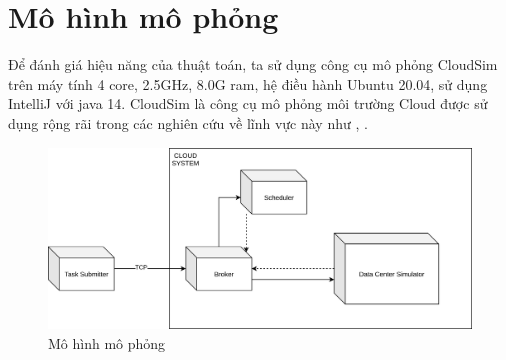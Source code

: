 \documentclass{my_style}
\begin{document}
\section{Mô hình mô phỏng}
Để đánh giá hiệu năng của thuật toán, ta sử dụng công cụ mô phỏng CloudSim~\cite{30} trên máy tính 4 core, 2.5GHz, 8.0G ram, hệ điều hành Ubuntu 20.04, sử dụng IntelliJ với java 14. CloudSim là công cụ mô phỏng môi trường Cloud được sử dụng rộng rãi trong các nghiên cứu về lĩnh vực này như \cite{31}, \cite{32}.\\
\begin{figure}[h!]
	\centering 
	\includegraphics[scale=0.5]{images/simulation_system.png}
	\caption{Mô hình mô phỏng}
	\label{fig:simuation_system}
\end{figure}
\end{document}

